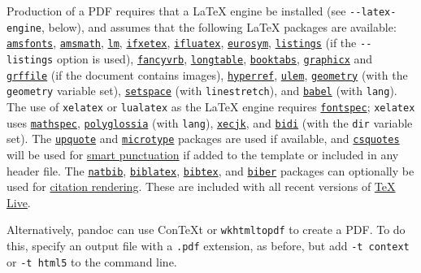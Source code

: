 \documentclass[]{article}
\begin{document}
Production of a PDF requires that a LaTeX engine be installed (see
\texttt{-\/-latex-engine}, below), and assumes that the following LaTeX
packages are available:
\href{https://ctan.org/pkg/amsfonts}{\texttt{amsfonts}},
\href{https://ctan.org/pkg/amsmath}{\texttt{amsmath}},
\href{https://ctan.org/pkg/lm}{\texttt{lm}},
\href{https://ctan.org/pkg/ifxetex}{\texttt{ifxetex}},
\href{https://ctan.org/pkg/ifluatex}{\texttt{ifluatex}},
\href{https://ctan.org/pkg/eurosym}{\texttt{eurosym}},
\href{https://ctan.org/pkg/listings}{\texttt{listings}} (if the
\texttt{-\/-listings} option is used),
\href{https://ctan.org/pkg/fancyvrb}{\texttt{fancyvrb}},
\href{https://ctan.org/pkg/longtable}{\texttt{longtable}},
\href{https://ctan.org/pkg/booktabs}{\texttt{booktabs}},
\href{https://ctan.org/pkg/graphicx}{\texttt{graphicx}} and
\href{https://ctan.org/pkg/grffile}{\texttt{grffile}} (if the document
contains images),
\href{https://ctan.org/pkg/hyperref}{\texttt{hyperref}},
\href{https://ctan.org/pkg/ulem}{\texttt{ulem}},
\href{https://ctan.org/pkg/geometry}{\texttt{geometry}} (with the
\texttt{geometry} variable set),
\href{https://ctan.org/pkg/setspace}{\texttt{setspace}} (with
\texttt{linestretch}), and
\href{https://ctan.org/pkg/babel}{\texttt{babel}} (with \texttt{lang}).
The use of \texttt{xelatex} or \texttt{lualatex} as the LaTeX engine
requires \href{https://ctan.org/pkg/fontspec}{\texttt{fontspec}};
\texttt{xelatex} uses
\href{https://ctan.org/pkg/mathspec}{\texttt{mathspec}},
\href{https://ctan.org/pkg/polyglossia}{\texttt{polyglossia}} (with
\texttt{lang}), \href{https://ctan.org/pkg/xecjk}{\texttt{xecjk}}, and
\href{https://ctan.org/pkg/bidi}{\texttt{bidi}} (with the \texttt{dir}
variable set). The \href{https://ctan.org/pkg/upquote}{\texttt{upquote}}
and \href{https://ctan.org/pkg/microtype}{\texttt{microtype}} packages
are used if available, and
\href{https://ctan.org/pkg/csquotes}{\texttt{csquotes}} will be used for
\protect\hyperlink{smart-punctuation}{smart punctuation} if added to the
template or included in any header file. The
\href{https://ctan.org/pkg/natbib}{\texttt{natbib}},
\href{https://ctan.org/pkg/biblatex}{\texttt{biblatex}},
\href{https://ctan.org/pkg/bibtex}{\texttt{bibtex}}, and
\href{https://ctan.org/pkg/biber}{\texttt{biber}} packages can
optionally be used for \protect\hyperlink{citation-rendering}{citation
rendering}. These are included with all recent versions of
\href{http://www.tug.org/texlive/}{TeX Live}.

Alternatively, pandoc can use ConTeXt or \texttt{wkhtmltopdf} to create
a PDF. To do this, specify an output file with a \texttt{.pdf}
extension, as before, but add \texttt{-t\ context} or \texttt{-t\ html5}
to the command line.
\end{document}
